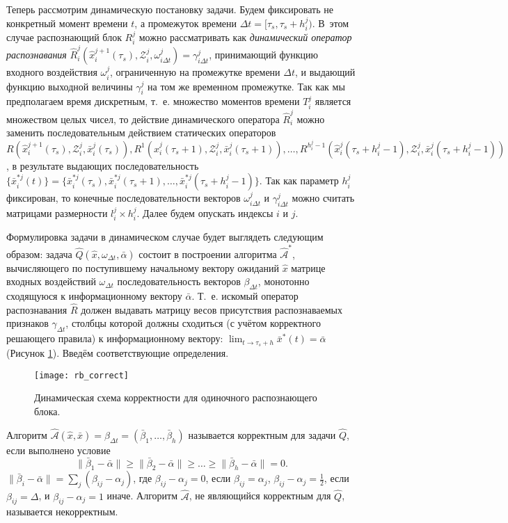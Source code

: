 Теперь рассмотрим динамическую постановку задачи. Будем фиксировать не конкретный момент времени $t$, а промежуток времени ${\Delta}t=[\tau_s,\tau_s+h_i^j)$. В~этом случае распознающий блок $R_i^j$ можно рассматривать как \textit{динамический оператор распознавания} $\hat{R}_i^j(\hat{x}_i^{j+1}(\tau_s), \mathcal{Z}_i^j, \omega_{i\Delta{t}}^j)=\gamma_{i\Delta{t}}^j$, принимающий  функцию входного воздействия $\omega_i^j$, ограниченную на промежутке времени ${\Delta}t$, и выдающий функцию выходной величины $\gamma_i^j$ на том же временном промежутке. Так как мы предполагаем время дискретным, т.~е. множество моментов времени $T_i^j$ является множеством целых чисел, то действие динамического оператора $\hat{R}_i^j$ можно заменить последовательным действием статических операторов $R(\hat{x}_i^{j+1}(\tau_s), \mathcal{Z}_i^j, \bar{x}_i^j(\tau_s)), R^1(\hat{x}_i^j(\tau_s+1), \mathcal{Z}_i^j, \bar{x}_i^j(\tau_s+1)), \dots, R^{h_i^j-1}(\hat{x}_i^j(\tau_s+h_i^j-1), \mathcal{Z}_i^j, \bar{x}_i^j(\tau_s+h_i^j-1))$, в результате выдающих последовательность $\{\bar{x}_i^{*j}(t)\}=\{\bar{x}_i^{*j}(\tau_s), \bar{x}_i^{*j}(\tau_s+1), \dots, \bar{x}_i^{*j}(\tau_s+h_i^j-1)\}$. Так как параметр $h_i^j$ фиксирован, то конечные последовательности векторов  $\omega_{i\Delta{t}}^j$ и $\gamma_{i\Delta{t}}^j$ можно считать матрицами размерности $l_i^j\times{h_i^j}$. Далее будем опускать индексы $i$ и $j$.
	
Формулировка задачи в динамическом случае будет выглядеть следующим образом: задача $\hat{Q}(\hat{x}, \omega_{{\Delta}t}, \bar{\alpha})$ состоит в построении алгоритма $\hat{\mathcal A}^*$, вычисляющего по поступившему начальному вектору ожиданий $\hat{x}$ матрице входных воздействий $\omega_{{\Delta}t}$  последовательность векторов $\beta_{\Delta{t}}$, монотонно сходящуюся к информационному вектору $\bar{\alpha}$. Т.~е. искомый оператор распознавания $\hat{R}$ должен выдавать матрицу весов присутствия распознаваемых признаков $\gamma_{\Delta{t}}$, столбцы которой должны сходиться (с учётом корректного решающего правила) к информационному вектору: $\lim_{t\to\tau_s+h}\bar{x}^*(t)=\bar{\alpha}$ (Рисунок \ref{fig:rb_correct_dyn}). Введём соответствующие определения.
	
\begin{figure}[h]
	\centering
	\texttt{[image: rb\_correct]}
	\caption{Динамическая схема корректности для одиночного распознающего блока.}
	\label{fig:rb_correct_dyn}
\end{figure}
	
\begin{Def}
	Алгоритм $\hat{\mathcal{A}}(\hat{x},\bar{x})=\beta_{\Delta{t}}=(\bar{\beta}_1,\dots,\bar{\beta}_h)$ называется корректным для задачи $\hat{Q}$, если выполнено условие
	\[
	\|\bar{\beta}_1-\bar{\alpha}\|\geqslant\|\bar{\beta}_2-\bar{\alpha}\|\geqslant\dots
	\geqslant\|\bar{\beta}_h-\bar{\alpha}\|=0.
	\]
	$\|\bar{\beta}_i-\bar{\alpha}\|=
	\sum_j{(\beta_{ij}-\alpha_j)}$, где $\beta_{ij}-\alpha_j=0$, если $\beta_{ij}=\alpha_j$, $\beta_{ij}-\alpha_j=\frac{1}{2}$, если $\beta_{ij}=\Delta$, и $\beta_{ij}-\alpha_j=1$ иначе. Алгоритм $\hat{\mathcal{A}}$, не являющийся корректным для $\hat{Q}$, называется некорректным.
\end{Def}

